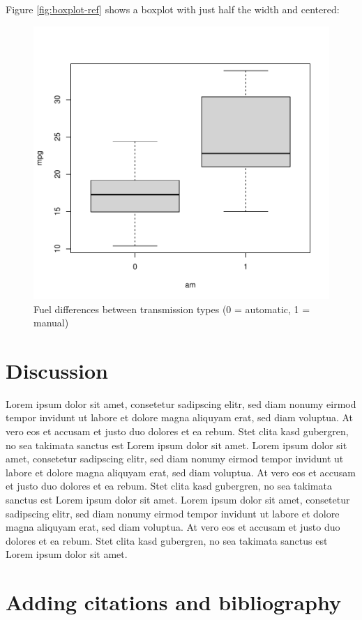 \documentclass[
11pt,
a4paper]{article}
\begin{document}
Figure \ref{fig:boxplot-ref} shows a boxplot with just half the width
and centered:

\begin{figure}

{\centering \includegraphics[width=0.5\linewidth]{figs/unnamed-chunk-5-1} 

}

\caption{Fuel differences between transmission types (0 = automatic, 1 = manual)\label{fig:boxplot-ref}}\label{fig:unnamed-chunk-5}
\end{figure}

\hypertarget{discussion}{%
\section{Discussion}\label{discussion}}

Lorem ipsum dolor sit amet, consetetur sadipscing elitr, sed diam nonumy
eirmod tempor invidunt ut labore et dolore magna aliquyam erat, sed diam
voluptua. At vero eos et accusam et justo duo dolores et ea rebum. Stet
clita kasd gubergren, no sea takimata sanctus est Lorem ipsum dolor sit
amet. Lorem ipsum dolor sit amet, consetetur sadipscing elitr, sed diam
nonumy eirmod tempor invidunt ut labore et dolore magna aliquyam erat,
sed diam voluptua. At vero eos et accusam et justo duo dolores et ea
rebum. Stet clita kasd gubergren, no sea takimata sanctus est Lorem
ipsum dolor sit amet. Lorem ipsum dolor sit amet, consetetur sadipscing
elitr, sed diam nonumy eirmod tempor invidunt ut labore et dolore magna
aliquyam erat, sed diam voluptua. At vero eos et accusam et justo duo
dolores et ea rebum. Stet clita kasd gubergren, no sea takimata sanctus
est Lorem ipsum dolor sit amet.

\hypertarget{adding-citations-and-bibliography}{%
\section{Adding citations and
bibliography}\label{adding-citations-and-bibliography}}
\end{document}
